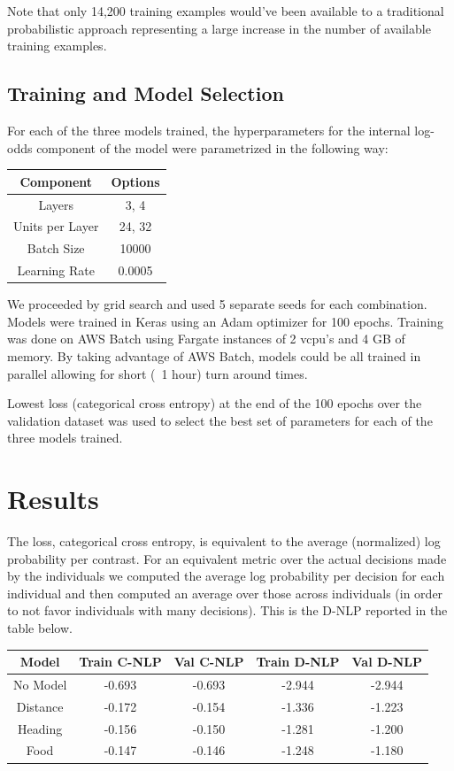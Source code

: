 \documentclass[11pt]{article}
\begin{document}
Note that only 14,200 training examples would've been available to a traditional probabilistic approach representing a large increase in the number of available training examples. 


\subsection*{Training and Model Selection}

For each of the three models trained, the hyperparameters for the internal log-odds component of the model were parametrized in the following way:

\begin{center}
\begin{tabular}{| c | c |} 
\hline 
Component & Options \\
\hline
Layers & 3, 4 \\ 
Units per Layer & 24, 32 \\
Batch Size & 10000 \\
Learning Rate & 0.0005 \\
\hline
\end{tabular}
\end{center}

We proceeded by grid search and used 5 separate seeds for each combination. Models were trained in Keras using an Adam optimizer for 100 epochs. Training was done on AWS Batch using Fargate instances of 2 vcpu's and 4 GB of memory. By taking advantage of AWS Batch,  models could be all trained in parallel allowing for short (~1 hour) turn around times. 

Lowest loss (categorical cross entropy) at the end of the 100 epochs over the validation dataset was used to select the best set of parameters for each of the three models trained.


\section*{Results}

The loss, categorical cross entropy, is equivalent to the average (normalized) log probability per contrast. For an equivalent metric over the actual decisions made by the individuals we computed the average log probability per decision for each individual and then computed an average over those across individuals (in order to not favor individuals with many decisions). This is the D-NLP reported in the table below. 

\begin{center}
\begin{tabular}{| c | c | c | c | c |}
\hline 
Model & Train C-NLP & Val C-NLP & Train D-NLP & Val D-NLP \\
\hline
No Model & -0.693 & -0.693 & -2.944 & -2.944 \\
Distance & -0.172 & -0.154 & -1.336 & -1.223 \\
Heading & -0.156 & -0.150 & -1.281 & -1.200 \\
Food & -0.147 & -0.146 & -1.248 & -1.180 \\
\hline
\end{tabular}
\end{center}
\end{document}
